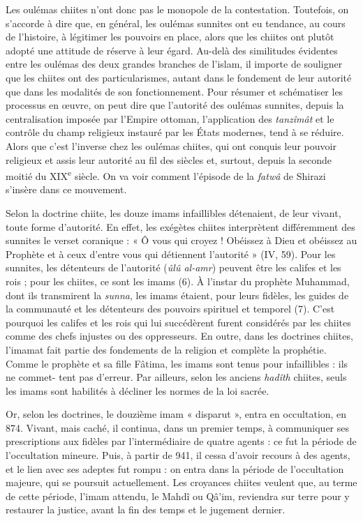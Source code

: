 Les oulémas chiites n'ont donc pas le monopole de la contestation.
Toutefois, on s'accorde à dire que, en général, les oulémas sunnites ont
eu tendance, au cours de l'histoire, à légitimer les pouvoirs en place,
alors que les chiites ont plutôt adopté une attitude de réserve à leur
égard. Au-delà des similitudes évidentes entre les oulémas des deux
grandes branches de l'islam, il importe de souligner que les chiites ont
des particularismes, autant dans le fondement de leur autorité que dans
les modalités de son fonctionnement. Pour résumer et schématiser les
processus en œuvre, on peut dire que l'autorité des oulémas sunnites,
depuis la centralisation imposée par l'Empire ottoman, l'application des
\emph{tanzîmât} et le contrôle du champ religieux instauré par les États
modernes, tend à se réduire. Alors que c'est l'inverse chez les oulémas
chiites, qui ont conquis leur pouvoir religieux et assis leur autorité
au fil des siècles et, surtout, depuis la seconde moitié du
XIX\textsuperscript{e} siècle. On va voir comment l'épisode de la
\emph{fatwâ} de Shirazi s'insère dans ce mouvement.

Selon la doctrine chiite, les douze imams infaillibles détenaient, de
leur vivant, toute forme d'autorité. En effet, les exégètes chiites
interprètent différemment des sunnites le verset coranique : « Ô vous
qui croyez ! Obéissez à Dieu et obéissez au Prophète et à ceux d'entre
vous qui détiennent l'autorité » (IV, 59). Pour les sunnites, les
détenteurs de l'autorité (\emph{ûlû al-amr}) peuvent être les califes et
les rois ; pour les chiites, ce sont les imams (6). À l'instar du
prophète Muhammad, dont ils transmirent la \emph{sunna}, les imams
étaient, pour leurs fidèles, les guides de la
communauté et les détenteurs des pouvoirs spirituel et temporel (7).
C'est pourquoi les califes et les rois qui lui succédèrent furent
considérés par les chiites comme des chefs injustes ou des oppresseurs.
En outre, dans les doctrines chiites, l'imamat fait partie des
fondements de la religion et complète la prophétie. Comme le prophète et
sa fille Fâtima, les imams sont tenus pour infaillibles : ils ne commet-
tent pas d'erreur. Par ailleurs, selon les anciens \emph{hadîth}
chiites, seuls les imams sont habilités à décliner les normes de la loi
sacrée.

Or, selon les doctrines, le douzième imam « disparut », entra en
occultation, en 874. Vivant, mais caché, il continua, dans un premier
temps, à communiquer ses prescriptions aux fidèles par l'intermédiaire
de quatre agents : ce fut la période de l'occultation mineure. Puis, à
partir de 941, il cessa d'avoir recours à des agents, et le lien avec
ses adeptes fut rompu : on entra dans la période de l'occultation
majeure, qui se poursuit actuellement. Les croyances chiites veulent
que, au terme de cette période, l'imam attendu, le Mahdî ou Qâ'im,
reviendra sur terre pour y restaurer la justice, avant la fin des temps
et le jugement dernier.


